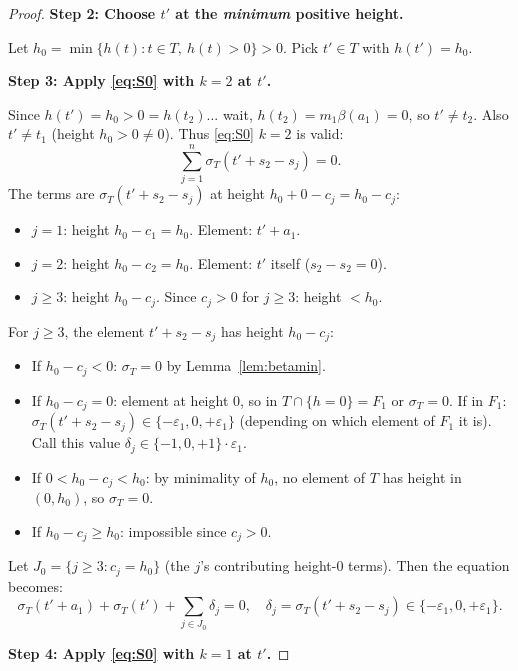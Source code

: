 \begin{proof}
\medskip
\noindent\textbf{Step 2: Choose $t'$ at the \emph{minimum} positive height.}

Let $h_0 = \min\{h(t) : t \in T,\ h(t) > 0\} > 0$.
Pick $t' \in T$ with $h(t') = h_0$.

\medskip
\noindent\textbf{Step 3: Apply \eqref{eq:S0} with $k=2$ at $t'$.}

Since $h(t') = h_0 > 0 = h(t_2)$... wait, $h(t_2) = m_1\beta(a_1)=0$, so $t' \neq t_2$.
Also $t' \neq t_1$ (height $h_0>0\neq 0$).  Thus \eqref{eq:S0} $k=2$ is valid:
\[
  \sum_{j=1}^n \sigma_T(t' + s_2 - s_j) = 0.
\]
The terms are $\sigma_T(t' + s_2 - s_j)$ at height $h_0 + 0 - c_j = h_0 - c_j$:
\begin{itemize}
\item $j=1$: height $h_0 - c_1 = h_0$. Element: $t' + a_1$.
\item $j=2$: height $h_0 - c_2 = h_0$. Element: $t'$ itself ($s_2-s_2=0$).
\item $j \geq 3$: height $h_0 - c_j$.  Since $c_j > 0$ for $j \geq 3$: height $< h_0$.
\end{itemize}

For $j \geq 3$, the element $t'+s_2-s_j$ has height $h_0-c_j$:
\begin{itemize}
\item If $h_0 - c_j < 0$: $\sigma_T = 0$ by Lemma~\ref{lem:betamin}.
\item If $h_0 - c_j = 0$: element at height $0$, so in $T \cap \{h=0\} = F_1$ or $\sigma_T=0$.
  If in $F_1$: $\sigma_T(t'+s_2-s_j) \in \{-\varepsilon_1, 0, +\varepsilon_1\}$ (depending on which
  element of $F_1$ it is).  Call this value $\delta_j \in \{-1,0,+1\} \cdot \varepsilon_1$.
\item If $0 < h_0 - c_j < h_0$: by minimality of $h_0$, no element of $T$ has height in
  $(0,h_0)$, so $\sigma_T = 0$.
\item If $h_0 - c_j \geq h_0$: impossible since $c_j > 0$.
\end{itemize}

Let $J_0 = \{j \geq 3 : c_j = h_0\}$ (the $j$'s contributing height-0 terms).
Then the equation becomes:
\begin{equation}\label{eq:k2}
  \sigma_T(t'+a_1) + \sigma_T(t') + \sum_{j \in J_0} \delta_j = 0,
  \quad \delta_j = \sigma_T(t'+s_2-s_j) \in \{-\varepsilon_1, 0, +\varepsilon_1\}.
\end{equation}

\medskip
\noindent\textbf{Step 4: Apply \eqref{eq:S0} with $k=1$ at $t'$.}


\end{proof}
